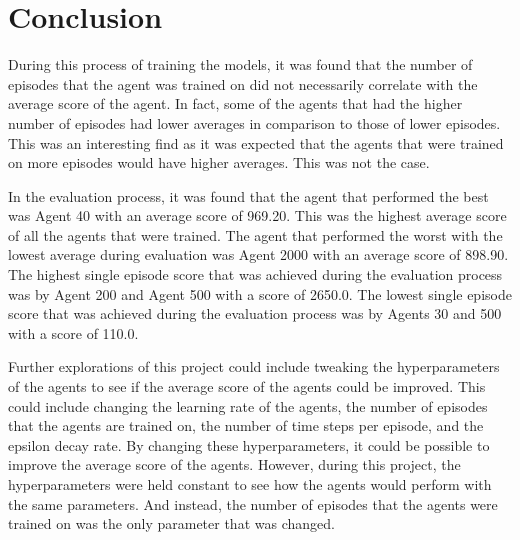 \documentclass[
	a4paper, %
	10pt, %
	unnumberedsections, %
	twoside, %
]{LTJournalArticle}
\begin{document}
\section{Conclusion}

During this process of training the models, it was found that the number of episodes that the agent was trained on did not necessarily correlate with the average score of the agent. In fact, some of 
the agents that had the higher number of episodes had lower averages in comparison to those of lower episodes. This was an interesting find as it was expected that the agents that were trained on more
episodes would have higher averages. This was not the case.

In the evaluation process, it was found that the agent that performed the best was Agent 40 with an average score of 969.20. This was the highest average score of all the agents that were trained. The
agent that performed the worst with the lowest average during evaluation was Agent 2000 with an average score of 898.90. The highest single episode score that was achieved during the evaluation process
was by Agent 200 and Agent 500 with a score of 2650.0. The lowest single episode score that was achieved during the evaluation process was by Agents 30 and 500 with a score of 110.0.

Further explorations of this project could include tweaking the hyperparameters of the agents to see if the average score of the agents could be improved. This could include changing the learning rate of
the agents, the number of episodes that the agents are trained on, the number of time steps per episode, and the epsilon decay rate. By changing these hyperparameters, it could be possible to improve the
average score of the agents. However, during this project, the hyperparameters were held constant to see how the agents would perform with the same parameters. And instead, the number of episodes that the
agents were trained on was the only parameter that was changed.
\end{document}
